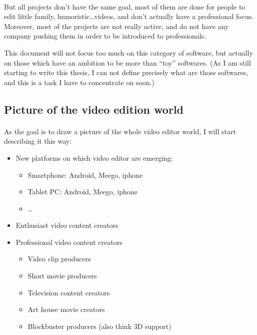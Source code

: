     \paragraph{}
        But all projects don't have the same goal, most of them are
        done for people to edit little family, humoristic\ldots videos,
        and don't actually have a professional focus. Moreover, most of the
        projects are not really active, and do not have any company pushing them
        in order to be introduced to professionals.

        This document will not focus too much on this category of software, but
        actually on those which have an ambition to be more than ``toy''
        softwares. (As I am still starting to write this thesis, I can not define
        precisely what are those softwares, and this is a task I have to
        concentrate on soon.)


    \subsection{Picture of the video edition world}
        \paragraph{}
            As the goal is to draw a picture of the whole video editor world, I
            will start describing it this way:
            \begin {itemize}
                \item {New platforms on which video editor are emerging:}
                \begin {itemize}
                    \item {Smartphone: Android, Meego, iphone}
                    \item {Tablet PC: Android, Meego, iphone}
                    \item {\ldots}
                \end {itemize}
                \item {Enthusiast video content creators}
                \item {Professional video content creators}
                \begin {itemize}
                    \item {Video clip producers}
                    \item {Short movie producers}
                    \item {Television content creators}
                    \item {Art house movie creators}
                    \item {Blockbuster producers (also think 3D support)}
                \end {itemize}
            \end {itemize}

